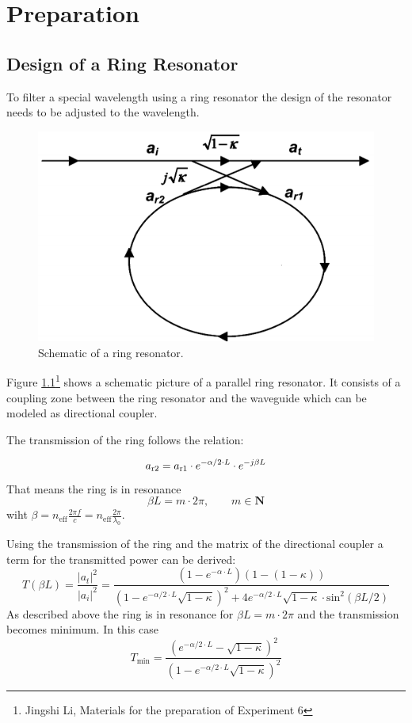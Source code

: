 \chapter{Preparation}


\section{Design of a Ring Resonator}
\label{design}
To filter a special wavelength using a ring resonator the design of the resonator needs to be adjusted to the wavelength.
\begin{figure}[h]%
\centering
\includegraphics[width=.5\columnwidth]{Grafiken/Resonator.png}%
\caption{Schematic of a ring resonator.}%
\label{fig:p1_ring}%
\end{figure} 
Figure \ref{fig:p1_ring}\footnote[1]{Jingshi Li, Materials for the preparation of Experiment 6} shows a schematic picture of a parallel ring resonator. It consists of a coupling zone between the ring resonator and the waveguide which can be modeled as directional coupler\footnotemark[1].

The transmission of the ring follows the relation:

\begin{equation}
a_{\mathrm{r2}}=a_{\mathrm{r1}}\cdot e^{-\alpha /2\cdot L}\cdot e^{-j\beta L}
\label{eq:}
\end{equation}
That means the ring is in resonance
\begin{equation}
\beta L = m\cdot2\pi,\qquad m \in \mathbf{N}
\label{eq:res}
\end{equation}
wiht $\beta = n_{\mathrm{eff}} \frac{2\pi f}{c} = n_{\mathrm{eff}} \frac{2\pi}{\lambda_0}$.

Using the transmission of the ring and the matrix of the directional coupler a term for the transmitted power can be derived\footnotemark[1]:
\begin{equation}
T(\beta L) = \frac{|a_t|^2}{|a_i|^2}= \frac{(1-e^{-\alpha \cdot L})(1-(1-\kappa))}{(1-e^{-\alpha /2\cdot L}\sqrt{1-\kappa})^2+4e^{-\alpha /2\cdot L}\sqrt{1-\kappa}\cdot\mathrm{sin}^2(\beta L / 2)}
\label{eq:}
\end{equation}
As described above the ring is in resonance for $\beta L = m\cdot2\pi$ and the transmission becomes minimum. 
In this case
\begin{equation}
T_{\mathrm{min}}=\frac{(e^{-\alpha /2\cdot L} - \sqrt{1-\kappa})^2}{(1 - e^{-\alpha /2\cdot L}\sqrt{1-\kappa})^2}
\label{eq:}
\end{equation}

